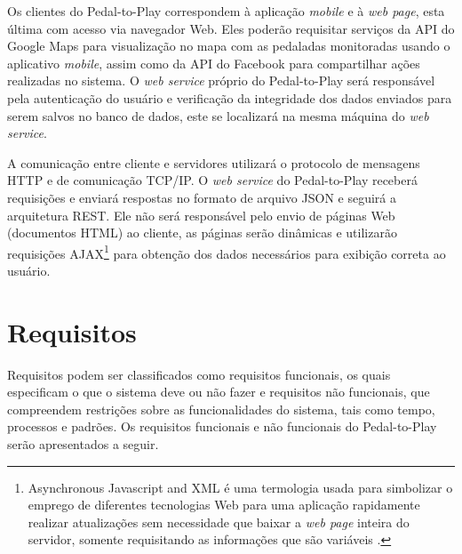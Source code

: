 \par Os clientes do Pedal-to-Play correspondem à aplicação \textit{mobile} e à \textit{web page}, esta última com acesso via navegador Web. Eles poderão requisitar serviços da API do Google Maps para visualização no mapa com as pedaladas monitoradas usando o aplicativo \textit{mobile}, assim como da API do Facebook para compartilhar ações realizadas no sistema. O \textit{web service} próprio do Pedal-to-Play será responsável pela autenticação do usuário e verificação da integridade dos dados enviados para serem salvos no banco de dados, este se localizará na mesma máquina do \textit{web service}.

\par A comunicação entre cliente e servidores utilizará o protocolo de mensagens HTTP e de comunicação TCP/IP. O \textit{web service} do Pedal-to-Play receberá requisições e enviará respostas no formato de arquivo JSON e seguirá a arquitetura REST. Ele não será responsável pelo envio de páginas Web (documentos HTML) ao cliente, as páginas serão dinâmicas e utilizarão requisições AJAX\footnote{Asynchronous Javascript and XML é uma termologia usada para simbolizar o emprego de diferentes tecnologias Web para uma aplicação rapidamente realizar atualizações sem necessidade que baixar a \textit{web page} inteira do servidor, somente requisitando as informações que são variáveis \cite{mdn2015ajax}.} para obtenção dos dados necessários para exibição correta ao usuário. 

\section{Requisitos}
Requisitos podem ser classificados como requisitos funcionais, os quais especificam o que o sistema deve ou não fazer e requisitos não funcionais, que compreendem restrições sobre as funcionalidades do sistema, tais como tempo, processos e padrões\cite{sommerville2003engenharia}. Os requisitos funcionais e não funcionais do Pedal-to-Play serão apresentados a seguir.

